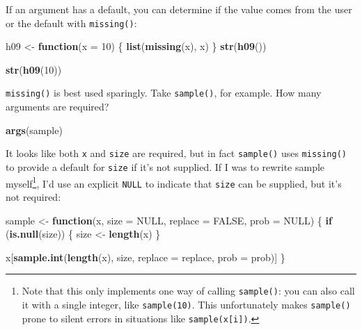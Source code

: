 \documentclass[]{book}
\newenvironment{Shaded}{\begin{snugshade}}{\end{snugshade}}
\newcommand{\KeywordTok}[1]{\textcolor[rgb]{0.13,0.29,0.53}{\textbf{#1}}}
\newcommand{\DataTypeTok}[1]{\textcolor[rgb]{0.13,0.29,0.53}{#1}}
\newcommand{\DecValTok}[1]{\textcolor[rgb]{0.00,0.00,0.81}{#1}}
\newcommand{\StringTok}[1]{\textcolor[rgb]{0.31,0.60,0.02}{#1}}
\newcommand{\OtherTok}[1]{\textcolor[rgb]{0.56,0.35,0.01}{#1}}
\newcommand{\ControlFlowTok}[1]{\textcolor[rgb]{0.13,0.29,0.53}{\textbf{#1}}}
\newcommand{\NormalTok}[1]{#1}
\let\rmarkdownfootnote\footnote%
\def\footnote{\protect\rmarkdownfootnote}
\theoremstyle{definition}
\theoremstyle{definition}
\theoremstyle{definition}
\theoremstyle{remark}
\begin{document}
If an argument has a default, you can determine if the value comes from
the user or the default with \texttt{missing()}:

\begin{Shaded}
\begin{Highlighting}[]
\NormalTok{h09 <-}\StringTok{ }\ControlFlowTok{function}\NormalTok{(}\DataTypeTok{x =} \DecValTok{10}\NormalTok{) \{}
  \KeywordTok{list}\NormalTok{(}\KeywordTok{missing}\NormalTok{(x), x)}
\NormalTok{\}}
\KeywordTok{str}\NormalTok{(}\KeywordTok{h09}\NormalTok{())}
\end{Highlighting}
\end{Shaded}

\begin{Shaded}
\begin{Highlighting}[]
\KeywordTok{str}\NormalTok{(}\KeywordTok{h09}\NormalTok{(}\DecValTok{10}\NormalTok{))}
\end{Highlighting}
\end{Shaded}

\texttt{missing()} is best used sparingly. Take \texttt{sample()}, for
example. How many arguments are required?

\begin{Shaded}
\begin{Highlighting}[]
\KeywordTok{args}\NormalTok{(sample)}
\end{Highlighting}
\end{Shaded}

It looks like both \texttt{x} and \texttt{size} are required, but in
fact \texttt{sample()} uses \texttt{missing()} to provide a default for
\texttt{size} if it's not supplied. If I was to rewrite sample
myself\footnote{Note that this only implements one way of calling
  \texttt{sample()}: you can also call it with a single integer, like
  \texttt{sample(10)}. This unfortunately makes \texttt{sample()} prone
  to silent errors in situations like \texttt{sample(x{[}i{]})}.}, I'd
use an explicit \texttt{NULL} to indicate that \texttt{size} can be
supplied, but it's not required:

\begin{Shaded}
\begin{Highlighting}[]
\NormalTok{sample <-}\StringTok{ }\ControlFlowTok{function}\NormalTok{(x, }\DataTypeTok{size =} \OtherTok{NULL}\NormalTok{, }\DataTypeTok{replace =} \OtherTok{FALSE}\NormalTok{, }\DataTypeTok{prob =} \OtherTok{NULL}\NormalTok{) \{}
  \ControlFlowTok{if}\NormalTok{ (}\KeywordTok{is.null}\NormalTok{(size)) \{}
\NormalTok{    size <-}\StringTok{ }\KeywordTok{length}\NormalTok{(x)}
\NormalTok{  \}}
  
\NormalTok{  x[}\KeywordTok{sample.int}\NormalTok{(}\KeywordTok{length}\NormalTok{(x), size, }\DataTypeTok{replace =}\NormalTok{ replace, }\DataTypeTok{prob =}\NormalTok{ prob)]}
\NormalTok{\}}
\end{Highlighting}
\end{Shaded}
\end{document}
